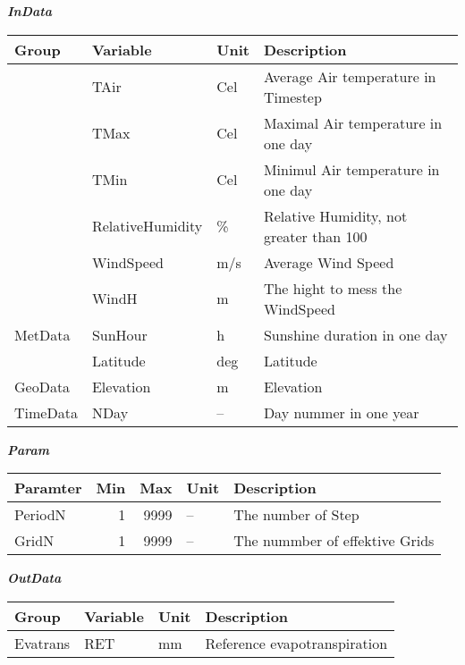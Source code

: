 \documentclass[
]{book}
\begin{document}
\textbf{\emph{InData}}

\begin{table}[!h]
\centering
\begin{tabular}{l|l|l|l}
\hline
Group & Variable & Unit & Description\\
\hline
 & TAir & Cel & Average Air temperature in Timestep\\
\cline{2-4}
 & TMax & Cel & Maximal Air temperature in one day\\
\cline{2-4}
 & TMin & Cel & Minimul Air temperature in one day\\
\cline{2-4}
 & RelativeHumidity & \% & Relative Humidity, not greater than 100\\
\cline{2-4}
 & WindSpeed & m/s & Average Wind Speed\\
\cline{2-4}
 & WindH & m & The hight to mess the WindSpeed\\
\cline{2-4}
\multirow{-7}{*}{\raggedright\arraybackslash MetData} & SunHour & h & Sunshine duration in one day\\
\cline{1-4}
 & Latitude & deg & Latitude\\
\cline{2-4}
\multirow{-2}{*}{\raggedright\arraybackslash GeoData} & Elevation & m & Elevation\\
\cline{1-4}
TimeData & NDay & -- & Day nummer in one year\\
\hline
\end{tabular}
\end{table}

\textbf{\emph{Param}}

\begin{table}[!h]
\centering
\begin{tabular}{l|r|r|l|l}
\hline
Paramter & Min & Max & Unit & Description\\
\hline
PeriodN & 1 & 9999 & -- & The number of Step\\
\cline{1-5}
GridN & 1 & 9999 & -- & The nummber of effektive Grids\\
\hline
\end{tabular}
\end{table}

\textbf{\emph{OutData}}

\begin{table}[!h]
\centering
\begin{tabular}{l|l|l|l}
\hline
Group & Variable & Unit & Description\\
\hline
Evatrans & RET & mm & Reference evapotranspiration\\
\hline
\end{tabular}
\end{table}
\end{document}
